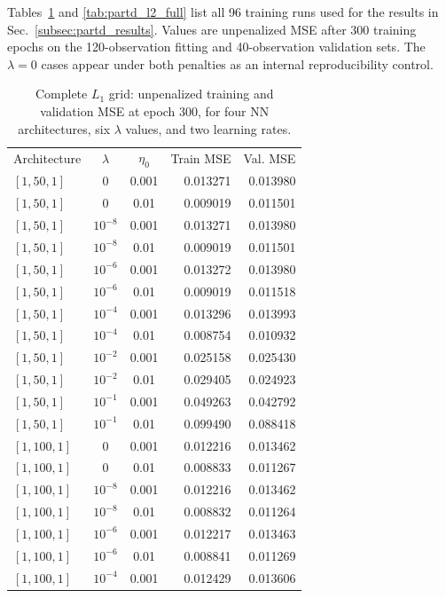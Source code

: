 \documentclass[aps,rmp,reprint,amsmath,amssymb,graphicx,longbibliography]{revtex4-1}
\begin{document}
Tables~\ref{tab:partd_l1_full} and \ref{tab:partd_l2_full} list all 96 training runs used for the results in Sec.~\ref{subsec:partd_results}.
Values are unpenalized MSE after 300 training epochs on the
120-observation fitting and 40-observation validation sets.
The $\lambda=0$ cases appear under both penalties as an internal
reproducibility control.
\begin{table}[p]
\centering
\caption{Complete $L_1$ grid: unpenalized training and validation MSE
at epoch 300, for four NN architectures, six $\lambda$ values,
and two learning rates.}
\label{tab:partd_l1_full}
\scriptsize
\begin{ruledtabular}
\begin{tabular}{lccrr}
Architecture & $\lambda$ & $\eta_0$ & Train MSE & Val. MSE \\
$[1,50,1]$ & $0$ & 0.001 & 0.013271 & 0.013980 \\
$[1,50,1]$ & $0$ & 0.01 & 0.009019 & 0.011501 \\
$[1,50,1]$ & $10^{-8}$ & 0.001 & 0.013271 & 0.013980 \\
$[1,50,1]$ & $10^{-8}$ & 0.01 & 0.009019 & 0.011501 \\
$[1,50,1]$ & $10^{-6}$ & 0.001 & 0.013272 & 0.013980 \\
$[1,50,1]$ & $10^{-6}$ & 0.01 & 0.009019 & 0.011518 \\
$[1,50,1]$ & $10^{-4}$ & 0.001 & 0.013296 & 0.013993 \\
$[1,50,1]$ & $10^{-4}$ & 0.01 & 0.008754 & 0.010932 \\
$[1,50,1]$ & $10^{-2}$ & 0.001 & 0.025158 & 0.025430 \\
$[1,50,1]$ & $10^{-2}$ & 0.01 & 0.029405 & 0.024923 \\
$[1,50,1]$ & $10^{-1}$ & 0.001 & 0.049263 & 0.042792 \\
$[1,50,1]$ & $10^{-1}$ & 0.01 & 0.099490 & 0.088418 \\
$[1,100,1]$ & $0$ & 0.001 & 0.012216 & 0.013462 \\
$[1,100,1]$ & $0$ & 0.01 & 0.008833 & 0.011267 \\
$[1,100,1]$ & $10^{-8}$ & 0.001 & 0.012216 & 0.013462 \\
$[1,100,1]$ & $10^{-8}$ & 0.01 & 0.008832 & 0.011264 \\
$[1,100,1]$ & $10^{-6}$ & 0.001 & 0.012217 & 0.013463 \\
$[1,100,1]$ & $10^{-6}$ & 0.01 & 0.008841 & 0.011269 \\
$[1,100,1]$ & $10^{-4}$ & 0.001 & 0.012429 & 0.013606 \\

\end{tabular}
\end{ruledtabular}
\end{table}
\end{document}
